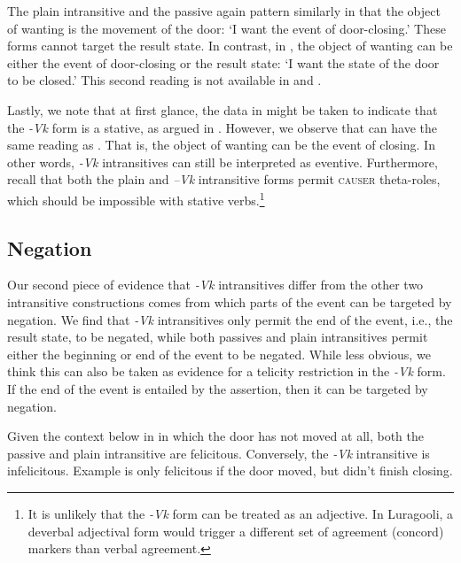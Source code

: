 \documentclass[output=paper]{langsci/lanmgscibook}
\begin{document}
The plain intransitive and the passive again pattern similarly in that the object of wanting is the movement of the door: ‘I want the event of door-closing.’ These forms cannot target the result state. In contrast, in , the object of wanting can be either the event of door-closing or the result state: ‘I want the state of the door to be closed.’ This second reading is not available in  and .

Lastly, we note that at first glance, the data in  might be taken to indicate that the \textit{-Vk} form is a stative, as argued in \citet{Dubinsky1996}. However, we observe that  can have the same reading as . That is, the object of wanting can be the event of closing. In other words, \textit{-Vk} intransitives can still be interpreted as eventive. Furthermore, recall that both the plain and \textit{–Vk} intransitive forms permit \textsc{causer} theta-roles, which should be impossible with stative verbs.\footnote{It is unlikely that the \textit{-Vk} form can be treated as an adjective. In Luragooli, a deverbal adjectival form would trigger a different set of agreement (concord) markers than verbal agreement.}

\subsection{Negation} 

Our second piece of evidence that \textit{-Vk} intransitives differ from the other two intransitive constructions comes from which parts of the event can be targeted by negation. We find that \textit{-Vk} intransitives only permit the end of the event, i.e., the result state, to be negated, while both passives and plain intransitives permit either the beginning or end of the event to be negated. While less obvious, we think this can also be taken as evidence for a telicity restriction in the \textit{-Vk} form. If the end of the event is entailed by the assertion, then it can be targeted by negation. 

Given the context below in  in which the door has not moved at all, both the passive  and plain intransitive  are felicitous. Conversely, the \textit{-Vk} intransitive  is infelicitous. Example  is only felicitous if the door moved, but didn’t finish closing.
\end{document}
